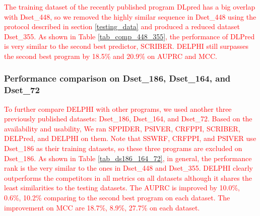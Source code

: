 \documentclass{bioinfo}
\newcommand{\myColor}{red}
\begin{document}
\textcolor{\myColor}{The training dataset of the recently published program DLpred has a big overlap with Dset\_448, so we removed the highly similar sequence in Dset\_448 using the protocol described in section \ref{testing_data} and produced a reduced dataset Dset\_355. As shown in Table \ref{tab_comp_448_355}, the performance of DLPred is very similar to the second best predictor, SCRIBER.  DELPHI still surpasses the second best program by 18.5\% and 20.9\% on AUPRC and MCC.  }

\subsubsection{Performance comparison on Dset\_186, Dset\_164, and Dset\_72}\label{section_four_tests}
\textcolor{\myColor}{To further compare DELPHI with other programs, we used another three previously published datasets: Dset\_186, Dset\_164, and Dset\_72. Based on the availability and usability, We ran SPPIDER, PSIVER, CRFPPI, SCRIBER, DELPred, and DELPHI on them. Note that SSWRF, CRFPPI, and PSIVER use Dset\_186 as their training datasets, so these three programs are excluded on Dset\_186. As shown in Table \ref{tab_ds186_164_72}, in general, the performance rank is the very similar to the ones in Dset\_448 and Dset\_355. DELPHI clearly outperforms the competitors in all metrics on all datasets although it shares the least similarities to the testing datasets.  The AUPRC is improved by 10.0\%, 0.6\%, 10.2\% comparing to the second best program on each dataset. The improvement on MCC are 18.7\%, 8.9\%, 27.7\% on each dataset. }
\end{document}

